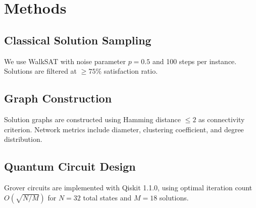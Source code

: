\section{Methods}
\subsection{Classical Solution Sampling}
We use WalkSAT with noise parameter $p=0.5$ and 100 steps per instance. Solutions are filtered at $\geq 75\%$ satisfaction ratio.

\subsection{Graph Construction}
Solution graphs are constructed using Hamming distance $\leq 2$ as connectivity criterion. Network metrics include diameter, clustering coefficient, and degree distribution.

\subsection{Quantum Circuit Design}
Grover circuits are implemented with Qiskit 1.1.0, using optimal iteration count $O(\sqrt{N/M})$ for $N=32$ total states and $M=18$ solutions.

